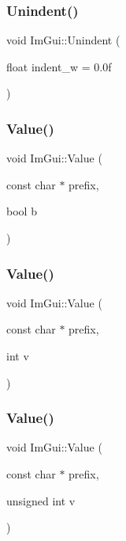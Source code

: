 \subsubsection{\texorpdfstring{Unindent()}{Unindent()}}
{\footnotesize\ttfamily void Im\+Gui\+::\+Unindent (\begin{DoxyParamCaption}\item[{float}]{indent\+\_\+w = {\ttfamily 0.0f} }\end{DoxyParamCaption})}

\hypertarget{namespace_im_gui_a1b3324308e43eeded5c3599fa0f03e85}{}\label{namespace_im_gui_a1b3324308e43eeded5c3599fa0f03e85} 
\subsubsection{\texorpdfstring{Value()}{Value()}\hspace{0.1cm}{\footnotesize\ttfamily [1/4]}}
{\footnotesize\ttfamily void Im\+Gui\+::\+Value (\begin{DoxyParamCaption}\item[{const char $\ast$}]{prefix,  }\item[{bool}]{b }\end{DoxyParamCaption})}

\hypertarget{namespace_im_gui_a654ceb70f2dd1598f88861f54764ee08}{}\label{namespace_im_gui_a654ceb70f2dd1598f88861f54764ee08} 
\subsubsection{\texorpdfstring{Value()}{Value()}\hspace{0.1cm}{\footnotesize\ttfamily [2/4]}}
{\footnotesize\ttfamily void Im\+Gui\+::\+Value (\begin{DoxyParamCaption}\item[{const char $\ast$}]{prefix,  }\item[{int}]{v }\end{DoxyParamCaption})}

\hypertarget{namespace_im_gui_aec80a3e35bf7c1ff5704334e5a3ebd5a}{}\label{namespace_im_gui_aec80a3e35bf7c1ff5704334e5a3ebd5a} 
\subsubsection{\texorpdfstring{Value()}{Value()}\hspace{0.1cm}{\footnotesize\ttfamily [3/4]}}
{\footnotesize\ttfamily void Im\+Gui\+::\+Value (\begin{DoxyParamCaption}\item[{const char $\ast$}]{prefix,  }\item[{unsigned int}]{v }\end{DoxyParamCaption})}

